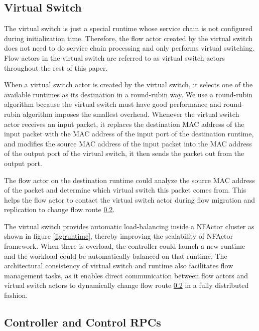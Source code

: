 \subsection{Virtual Switch}

The virtual switch is just a special runtime whose service chain is not configured during initialization time. Therefore, the flow actor created by the virtual switch does not need to do service chain processing and only performs virtual switching. Flow actors in the virtual switch are referred to as virtual switch actors throughout the rest of this paper.

When a virtual switch actor is created by the virtual switch, it selects one of the available runtimes as its destination in a round-rubin way. We use a round-rubin algorithm because the virtual switch must have good performance and round-rubin algorithm imposes the smallest overhead. Whenever the virtual switch actor receives an input packet, it replaces the destination MAC address of the input packet with the MAC address of the input port of the destination runtime, and modifies the source MAC address of the input packet into the MAC address of the output port of the virtual switch, it then sends the packet out from the output port.

The flow actor on the destination runtime could analyze the source MAC address of the packet and determine which virtual switch this packet comes from. This helps the flow actor to contact the virtual switch actor during flow migration and replication to change flow route \ref{}.

The virtual switch provides automatic load-balancing inside a NFActor cluster as shown in figure \ref{fig:runtime}, thereby improving the scalability of NFActor framework. When there is overload, the controller could launch a new runtime and the workload could be automatically balanced on that runtime. The architectural consistency of virtual switch and runtime also facilitates flow management tasks, as it enables direct communication between flow actors and virtual switch actors to dynamically change flow route \ref{} in a fully distributed fashion.

\subsection{Controller and Control RPCs}


